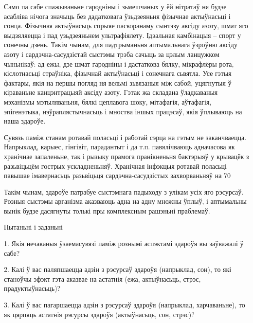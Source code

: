 Само па сабе спажываньне гародніны і зьмешчаных у ёй нітратаў ня будзе асабліва нічога значыць без дадатковага ўзьдзеяньня фізычнае актыўнасьці і сонца. Фізычная актыўнасьць спрыяе паскоранаму сынтэзу аксіду азоту, шмат яго выдзяляецца і пад узьдзеяньнем ультрафіялету. Ідэальная камбінацыя – спорт у сонечны дзень. Такім чынам, для падтрыманьня аптымальнага ўзроўню аксіду азоту і сардэчна-сасудзістай сыстэмы трэба сачыць за цэлым ланцужком чыньнікаў: ад ежы, дзе шмат гародніны і дастаткова бялку, мікрафлёры рота, кіслотнасьці страўніка, фізычнай актыўнасьці і сонечнага сьвятла. Усе гэтыя фактары, якія на першы погляд ня вельмі зьвязаныя між сабой, уцягнутыя ў кіраваньне канцэнтрацыяй аксіду азоту. Гэтак жа складана ўладкаваныя мэханізмы мэтыляваньня, бялкі цеплавога шоку, мітафагія, аўтафагія, эпігенэтыка, нэўраплястычнасьць і мноства іншых працэсаў, якія ўплываюць на наша здароўе.

Сувязь паміж станам ротавай поласьці і работай сэрца на гэтым не заканчваецца. Напрыклад, карыес, гінгівіт, парадантыт і да т.п. павялічваюць адначасова як хранічнае запаленьне, так і рызыку прамога пранікненьня бактэрыяў у крывацёк з разьвіцьцём гострых ускладненьняў. Хранічная інфэкцыя ротавай поласьці павышае імавернасьць разьвіцьця сардэчна-сасудзістых захворваньняў на 70%

Такім чынам, здароўе патрабуе сыстэмнага падыходу з улікам усіх яго рэсурсаў. Розныя сыстэмы арганізма аказваюць адна на адну множны ўплыў, і аптымальны вынік будзе дасягнуты толькі пры комплексным рашэньні праблемаў.

Пытаньні і заданьні

1. Якія нечаканыя ўзаемасувязі паміж рознымі аспэктамі здароўя вы заўважалі ў сабе?

2. Калі ў вас паляпшаецца адзін з рэсурсаў здароўя (напрыклад, сон), то які станоўчы эфэкт гэта аказвае на астатнія (ежа, актыўнасьць, стрэс, прадуктыўнасьць)?

3. Калі ў вас пагаршаецца адзін з рэсурсаў здароўя (напрыклад, харчаваньне), то як цярпяць астатнія рэсурсы здароўя (актыўнасьць, сон, стрэс)?


